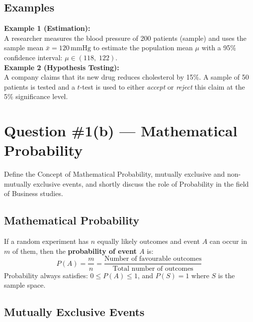 \documentclass[12pt]{article}
\begin{document}
\subsection*{Examples}

\begin{formulabox}
\textbf{Example 1 (Estimation):}\\
A researcher measures the blood pressure of 200 patients (sample) and uses the sample mean $\bar{x} = 120\,\text{mmHg}$ to estimate the population mean $\mu$ with a 95\% confidence interval: $\mu \in (118,\; 122)$.\\[8pt]
\textbf{Example 2 (Hypothesis Testing):}\\
A company claims that its new drug reduces cholesterol by 15\%. A sample of 50 patients is tested and a $t$-test is used to either \emph{accept} or \emph{reject} this claim at the 5\% significance level.
\end{formulabox}

\newpage

\section{Question \#1(b) --- Mathematical Probability}

\begin{problembox}
Define the Concept of Mathematical Probability, mutually exclusive and non-mutually exclusive events, and shortly discuss the role of Probability in the field of Business studies.
\end{problembox}

\subsection*{Mathematical Probability}

\begin{conceptbox}
If a random experiment has $n$ equally likely outcomes and event $A$ can occur in $m$ of them, then the \textbf{probability of event $A$} is:
\[
  P(A) = \frac{m}{n} = \frac{\text{Number of favourable outcomes}}{\text{Total number of outcomes}}
\]
Probability always satisfies: $0 \le P(A) \le 1$, and $P(S) = 1$ where $S$ is the sample space.
\end{conceptbox}

\subsection*{Mutually Exclusive Events}
\end{document}
